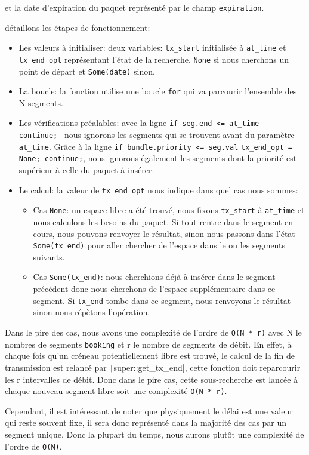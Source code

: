 \documentclass{article}
\begin{document}
\begin{description}
\begin{itemize}
        et la date d'expiration du paquet représenté par le champ \texttt{expiration}.
    \end{itemize}
    \item[Le fonctionnement algorithmique :] détaillons les étapes de fonctionnement:
    \begin{itemize}
        \item Les valeurs à initialiser: deux variables: \texttt{tx\_start} initialisée à \texttt{at\_time}
        et \texttt{tx\_end\_opt} représentant l'état de la recherche, \texttt{None} si nous cherchons un point de départ et \texttt{Some(date)} sinon.
        \item La boucle: la fonction utilise une boucle \texttt{for} qui va parcourir l'ensemble des N segments.
        \item Les vérifications préalables: avec la ligne \texttt{if seg.end <= at_time { continue; }} nous ignorons les segments qui se trouvent avant du paramètre \texttt{at\_time}.
        Grâce à la ligne \texttt{if bundle.priority <= seg.val} \texttt{tx_end_opt = None; continue;}, nous ignorons également les segments dont la priorité est supérieur à celle du paquet à insérer.
        \item Le calcul: la valeur de \texttt{tx\_end\_opt} nous indique dans quel cas nous sommes:
        \begin{itemize}
            \item Cas \texttt{None}: un espace libre a été trouvé, nous fixons \texttt{tx\_start} à \texttt{at\_time} et nous calculons les besoins du paquet.
            Si tout rentre dans le segment en cours, nous pouvons renvoyer le résultat, sinon nous passons dans l'état \texttt{Some(tx\_end)} pour aller chercher de l'espace dans le ou les segments suivants.
            \item Cas \texttt{Some(tx\_end)}: nous cherchions déjà à insérer dans le segment précédent donc nous cherchons de l'espace supplémentaire dans ce segment. Si \texttt{tx\_end} tombe dans ce segment, nous renvoyons le résultat sinon nous répètons l'opération.
        \end{itemize}
    \end{itemize}
    \item[La complexité en temps :]
    Dans le pire des cas, nous avons une complexité de l'ordre de \texttt{O(N * r)} avec N le nombres de segments \texttt{booking} et r le nombre de segments de débit.
    En effet, à chaque fois qu'un créneau potentiellement libre est trouvé, le calcul de la fin de transmission est relancé par \texttt|super::get_tx_end|, cette fonction doit reparcourir les r intervalles de débit.
    Donc dans le pire cas, cette sous-recherche est lancée à chaque nouveau segment libre soit une complexité \texttt{O(N * r)}.

    Cependant, il est intéressant de noter que physiquement le délai est une valeur qui reste souvent fixe, il sera donc représenté dans la majorité des cas par un segment unique.
    Donc la plupart du temps, nous aurons plutôt une complexité de l'ordre de \texttt{O(N)}.
    
\end{description}
\end{document}
